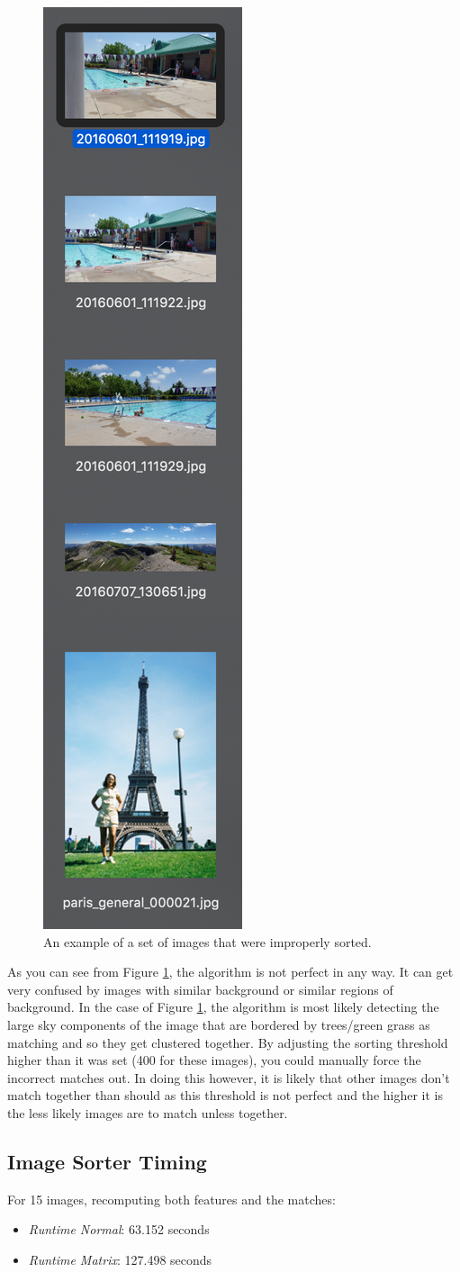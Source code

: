 \documentclass[12pt]{article}
\begin{document}
\begin{figure}[H]
	\centering
	\includegraphics[width=.2\textwidth]{images/wrong_match_1.png}
	\caption{An example of a set of images that were improperly sorted.}
	\label{fig:incorrect_sort}
\end{figure}

	As you can see from Figure \ref{fig:incorrect_sort}, the algorithm is not perfect in any way. It can get very confused by images with similar background or similar regions of background. In the case of Figure \ref{fig:incorrect_sort}, the algorithm is most likely detecting the large sky components of the image that are bordered by trees/green grass as matching and so they get clustered together. By adjusting the sorting threshold higher than it was set (400 for these images), you could manually force the incorrect matches out. In doing this however, it is likely that other images don't match together than should as this threshold is not perfect and the higher it is the less likely images are to match unless together.

\subsection{Image Sorter Timing}
	For 15 images, recomputing both features and the matches: 
	\begin{itemize}
		\item \textit{Runtime Normal}: 63.152 seconds
		\item \textit{Runtime Matrix}: 127.498 seconds
	\end{itemize}
	
\end{document}
